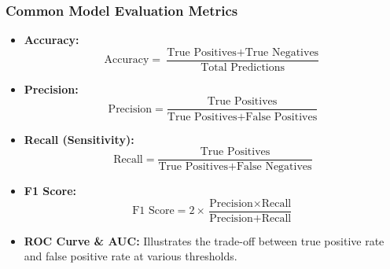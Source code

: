 \documentclass[aspectratio=169]{beamer}
\begin{document}
\begin{frame}[fragile]
    \frametitle{Common Model Evaluation Metrics}
    \begin{itemize}
        \item \textbf{Accuracy:}
        \begin{equation}
        \text{Accuracy} = \frac{\text{True Positives} + \text{True Negatives}}{\text{Total Predictions}}
        \end{equation}

        \item \textbf{Precision:}
        \begin{equation}
        \text{Precision} = \frac{\text{True Positives}}{\text{True Positives} + \text{False Positives}}
        \end{equation}

        \item \textbf{Recall (Sensitivity):}
        \begin{equation}
        \text{Recall} = \frac{\text{True Positives}}{\text{True Positives} + \text{False Negatives}}
        \end{equation}

        \item \textbf{F1 Score:}
        \begin{equation}
        \text{F1 Score} = 2 \times \frac{\text{Precision} \times \text{Recall}}{\text{Precision} + \text{Recall}}
        \end{equation}

        \item \textbf{ROC Curve \& AUC:} Illustrates the trade-off between true positive rate and false positive rate at various thresholds.
    \end{itemize}
\end{frame}
\end{document}
